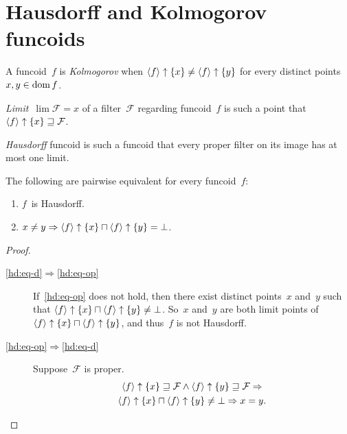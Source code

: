 \section{Hausdorff and Kolmogorov funcoids}

\begin{defn}
A funcoid~$f$ is \emph{Kolmogorov} when
$\left\langle f\right\rangle\uparrow\{x\}\ne\left\langle f\right\rangle\uparrow\{y\}$ for every distinct points
$x,y\in\operatorname{dom} f$.
\end{defn}

\begin{defn}
\emph{Limit}~$\lim\mathcal{F}=x$ of a filter~$\mathcal{F}$
regarding funcoid~$f$ is such a point that $\left\langle f\right\rangle\uparrow\{x\}\sqsupseteq\mathcal{F}$.
\end{defn}

\begin{defn}
\emph{Hausdorff} funcoid is such a funcoid that every proper
filter on its image has at most one limit.
\end{defn}

\begin{prop}
The following are pairwise equivalent for every funcoid~$f$:
\begin{enumerate}
\item\label{hd:eq-d} $f$~is Hausdorff.
\item\label{hd:eq-op}
$x\ne y\Rightarrow\left\langle f\right\rangle\uparrow\{x\}\sqcap\left\langle f\right\rangle\uparrow\{y\}=\bot$.
\end{enumerate}
\end{prop}

\begin{proof}
~
\begin{description}
\item[\ref{hd:eq-d}$\Rightarrow$\ref{hd:eq-op}]
If~\ref{hd:eq-op} does not hold,
then there exist distinct points~$x$ and~$y$ such that
$\left\langle f\right\rangle\uparrow\{x\}\sqcap\left\langle f\right\rangle\uparrow\{y\}\ne\bot$.
So~$x$ and~$y$ are both limit points of
$\left\langle f\right\rangle\uparrow\{x\}\sqcap\left\langle f\right\rangle\uparrow\{y\}$, and thus~$f$ is not
Hausdorff.
\item[\ref{hd:eq-op}$\Rightarrow$\ref{hd:eq-d}]
Suppose~$\mathcal{F}$ is proper.
\begin{multline*}
\left\langle f\right\rangle\uparrow\{x\}\sqsupseteq\mathcal{F}\land
\left\langle f\right\rangle\uparrow\{y\}\sqsupseteq\mathcal{F}\Rightarrow \\
\left\langle f\right\rangle\uparrow\{x\}\sqcap\left\langle f\right\rangle\uparrow\{y\}\ne\bot \Rightarrow x=y.
\end{multline*}
\end{description}
\end{proof}

